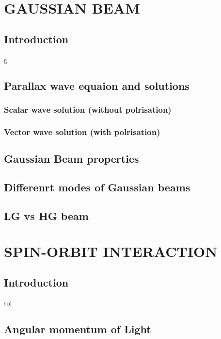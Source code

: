 \documentclass[11pt,a4paper]{article}
\begin{document}
\clearpage
\section{GAUSSIAN BEAM}
\subsection{Introduction}
g
\subsection{Parallax wave equaion and solutions}
\subsubsection{Scalar wave solution (without polrisation)}

\subsubsection{Vector wave solution (with polrisation)}

\subsection{Gaussian Beam properties}

\subsection{Differenrt modes of Gaussian beams}

\subsection{LG vs HG beam}

\clearpage
\section{SPIN-ORBIT INTERACTION}
\subsection{Introduction}
soi
\subsection{Angular momentum of Light}
\end{document}
